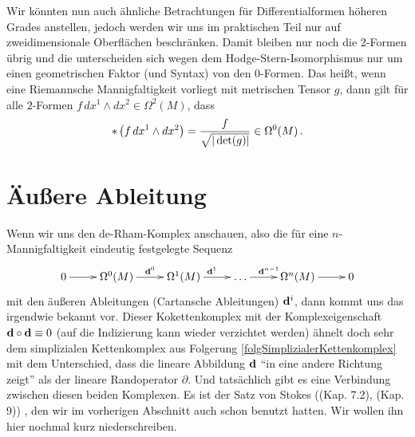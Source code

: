 \begin{bemerkung}
    Wir könnten nun auch ähnliche Betrachtungen für Differentialformen höheren Grades anstellen, jedoch werden wir uns im praktischen Teil nur auf zweidimensionale Oberflächen beschränken.
    Damit bleiben nur noch die \( 2 \)-Formen übrig und die unterscheiden sich wegen dem Hodge-Stern-Isomorphismus nur um einen geometrischen Faktor (und Syntax) von den \( 0 \)-Formen.
    Das heißt, wenn eine Riemannsche Mannigfaltigkeit vorliegt mit metrischen Tensor \( g \), dann gilt für alle \( 2 \)-Formen \( f \, dx^{1}\wedge dx^{2} \in \Omega^{2}(M)\), dass
    \begin{align}
      \label{eqHodgeIso2Form}
      * \left( f \, dx^{1}\wedge dx^{2} \right) = \frac{f}{\sqrt{|\det(g)|}} \in \Omega^{0}(M) \,\text{.}
    \end{align}
  \end{bemerkung}




  
  

\section{Äußere Ableitung}
  
  Wenn wir uns den de-Rham-Komplex anschauen, also die für eine \( n \)-Mannigfaltigkeit eindeutig festgelegte Sequenz
    \begin{align}
      \begin{xy}
        \xymatrix{
          0 \ar[r] & 
          \Omega^{0}(M) \ar[r]^{\exd^{0}} &
          \Omega^{1}(M) \ar[r]^{\exd^{1}} &
          \ldots \ar[r]^{\exd^{n-1}} &
          \Omega^{n}(M) \ar[r] &
          0 \\
        }
      \end{xy}
    \end{align}
  mit den äußeren Ableitungen (Cartansche Ableitungen) \( \mathbf{d}^{i} \), dann kommt uns das irgendwie bekannt vor.
  Dieser Kokettenkomplex mit der Komplexeigenschaft \( \mathbf{d}\circ\mathbf{d} \equiv 0 \) (auf die Indizierung kann wieder verzichtet werden) ähnelt
  doch sehr dem simplizialen Kettenkomplex aus Folgerung \ref{folgSimplizialerKettenkomplex} mit dem Unterschied, dass die lineare
  Abbildung \( \mathbf{d} \) "`in eine andere Richtung zeigt"' als der lineare Randoperator \( \partial \).
  Und tatsächlich gibt es eine Verbindung zwischen diesen beiden Komplexen.
  Es ist der Satz von Stokes 
  (\cite{Marsden}(Kap. 7.2), \cite{jaenich}(Kap. 9))
  , den wir im vorherigen Abschnitt auch schon benutzt hatten.
  Wir wollen ihn hier nochmal kurz niederschreiben.

